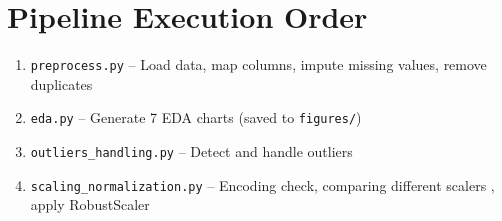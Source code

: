 \documentclass[12pt, a4paper]{article}
\begin{document}
\section{Pipeline Execution Order}

\begin{enumerate}[noitemsep]
    \item \texttt{preprocess.py} -- Load data, map columns, impute missing values, remove duplicates
    \item \texttt{eda.py} -- Generate 7 EDA charts (saved to \texttt{figures/})
    \item \texttt{outliers\_handling.py} -- Detect and handle outliers 
    \item \texttt{scaling\_normalization.py} -- Encoding check, comparing different scalers , apply RobustScaler
\end{enumerate}
\end{document}
